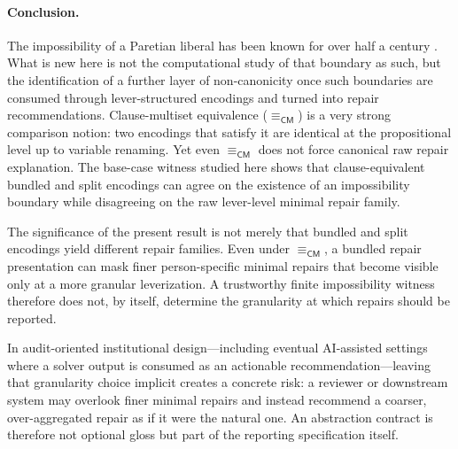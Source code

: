 \paragraph{Conclusion.}
The impossibility of a Paretian liberal has been known for over half a century \citep{sen1970}.
What is new here is not the computational study of that boundary as such, but the identification of a further layer of non-canonicity once such boundaries are consumed through lever-structured encodings and turned into repair recommendations.
Clause-multiset equivalence ($\equiv_{\mathsf{CM}}$) is a very strong comparison notion: two encodings that satisfy it are identical at the propositional level up to variable renaming.
Yet even $\equiv_{\mathsf{CM}}$ does not force canonical raw repair explanation.
The base-case witness studied here shows that clause-equivalent bundled and split encodings can agree on the existence of an impossibility boundary while disagreeing on the raw lever-level minimal repair family.

The significance of the present result is not merely that bundled and split encodings yield different repair families.
Even under $\equiv_{\mathsf{CM}}$, a bundled repair presentation can mask finer person-specific minimal repairs that become visible only at a more granular leverization.
A trustworthy finite impossibility witness therefore does not, by itself, determine the granularity at which repairs should be reported.

In audit-oriented institutional design---including eventual AI-assisted settings where a solver output is consumed as an actionable recommendation---leaving that granularity choice implicit creates a concrete risk: a reviewer or downstream system may overlook finer minimal repairs and instead recommend a coarser, over-aggregated repair as if it were the natural one.
An abstraction contract is therefore not optional gloss but part of the reporting specification itself.
